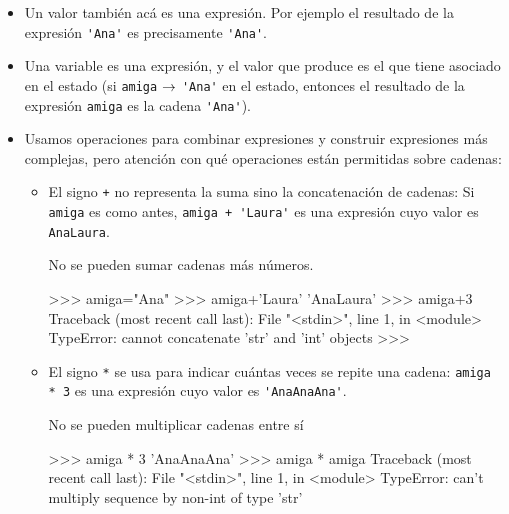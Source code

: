 \begin{itemize}
\item Un valor también acá es una expresión. Por ejemplo el
resultado de la expresión \lstinline!'Ana'! es precisamente
\lstinline!'Ana'!.

\item Una variable es una expresión, y el valor que produce es el
que tiene asociado en el estado (si \lstinline!amiga! $\rightarrow$
\lstinline!'Ana'! en el estado, entonces el resultado de la
expresión \lstinline!amiga! es la cadena \lstinline!'Ana'!).

\item Usamos operaciones para combinar expresiones y construir
expresiones más complejas, pero atención con qué operaciones están
permitidas sobre cadenas:

\begin{itemize}
\item El signo \lstinline!+! no representa la suma sino la concatenación
de cadenas: Si \lstinline!amiga! es como antes, \lstinline!amiga + 'Laura'!
es una expresión cuyo valor es \lstinline!AnaLaura!.

\begin{atencion}
No se pueden sumar cadenas más números.
\begin{codigo-python-sn}
>>> amiga="Ana"
>>> amiga+'Laura'
'AnaLaura'
>>> amiga+3
Traceback (most recent call last):
  File "<stdin>", line 1, in <module>
TypeError: cannot concatenate 'str' and 'int' objects
>>>
\end{codigo-python-sn}
\end{atencion}

\item El signo \lstinline!*! se usa para indicar cuántas veces se repite
una cadena: \lstinline!amiga * 3! es una expresión cuyo valor es
\lstinline!'AnaAnaAna'!.

\begin{atencion}
No se pueden multiplicar cadenas entre sí

\begin{codigo-python-sn}
>>> amiga * 3
'AnaAnaAna'
>>> amiga * amiga
Traceback (most recent call last):
  File "<stdin>", line 1, in <module>
TypeError: can't multiply sequence by non-int of type 'str'
\end{codigo-python-sn}
\end{atencion}

\end{itemize}

\end{itemize}

